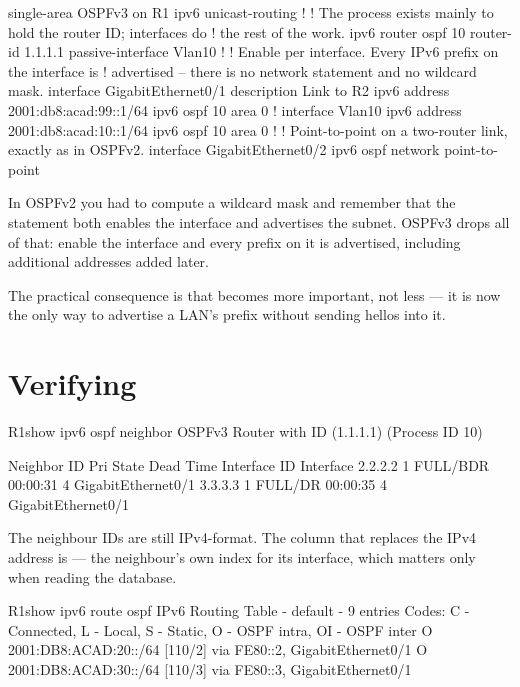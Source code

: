 \begin{config}{single-area OSPFv3 on R1}
ipv6 unicast-routing
!
! The process exists mainly to hold the router ID; interfaces do
! the rest of the work.
ipv6 router ospf 10
 router-id 1.1.1.1
 passive-interface Vlan10
!
! Enable per interface. Every IPv6 prefix on the interface is
! advertised -- there is no network statement and no wildcard mask.
interface GigabitEthernet0/1
 description Link to R2
 ipv6 address 2001:db8:acad:99::1/64
 ipv6 ospf 10 area 0
!
interface Vlan10
 ipv6 address 2001:db8:acad:10::1/64
 ipv6 ospf 10 area 0
!
! Point-to-point on a two-router link, exactly as in OSPFv2.
interface GigabitEthernet0/2
 ipv6 ospf network point-to-point
\end{config}

\begin{conceptbox}
In OSPFv2 you had to compute a wildcard mask and remember that the statement both
enables the interface and advertises the subnet. OSPFv3 drops all of that: enable
the interface and every prefix on it is advertised, including additional
addresses added later.

The practical consequence is that  becomes more important,
not less --- it is now the only way to advertise a LAN's prefix without sending
hellos into it.
\end{conceptbox}

\section{Verifying}

\begin{verify}{R1}{show ipv6 ospf neighbor}
            OSPFv3 Router with ID (1.1.1.1) (Process ID 10)

Neighbor ID     Pri   State           Dead Time   Interface ID    Interface
2.2.2.2           1   FULL/BDR        00:00:31    4               GigabitEthernet0/1
3.3.3.3           1   FULL/DR         00:00:35    4               GigabitEthernet0/1
\end{verify}

The neighbour IDs are still IPv4-format. The column that replaces the IPv4
address is  --- the neighbour's own index for its interface,
which matters only when reading the database.

\begin{verify}{R1}{show ipv6 route ospf}
IPv6 Routing Table - default - 9 entries
Codes: C - Connected, L - Local, S - Static, O - OSPF intra, OI - OSPF inter
O   2001:DB8:ACAD:20::/64 [110/2]
     via FE80::2, GigabitEthernet0/1
O   2001:DB8:ACAD:30::/64 [110/3]
     via FE80::3, GigabitEthernet0/1
\end{verify}

